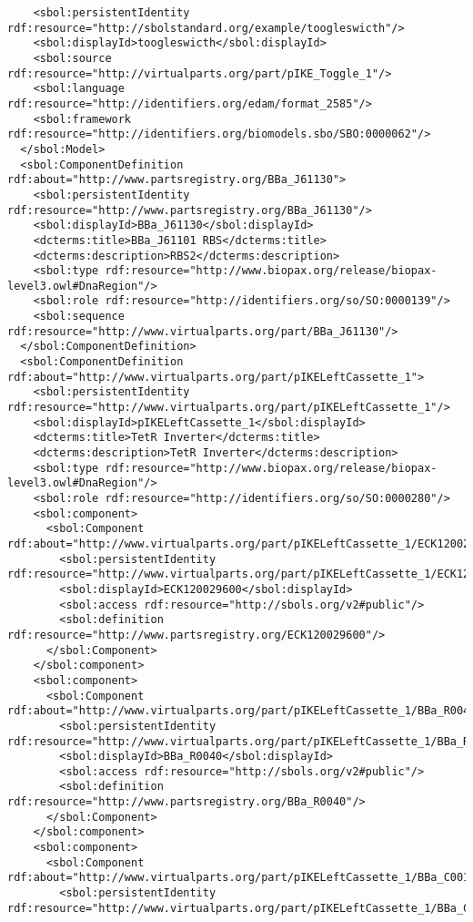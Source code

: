 \begin{lstlisting}
    <sbol:persistentIdentity rdf:resource="http://sbolstandard.org/example/toogleswicth"/>
    <sbol:displayId>toogleswicth</sbol:displayId>
    <sbol:source rdf:resource="http://virtualparts.org/part/pIKE_Toggle_1"/>
    <sbol:language rdf:resource="http://identifiers.org/edam/format_2585"/>
    <sbol:framework rdf:resource="http://identifiers.org/biomodels.sbo/SBO:0000062"/>
  </sbol:Model>
  <sbol:ComponentDefinition rdf:about="http://www.partsregistry.org/BBa_J61130">
    <sbol:persistentIdentity rdf:resource="http://www.partsregistry.org/BBa_J61130"/>
    <sbol:displayId>BBa_J61130</sbol:displayId>
    <dcterms:title>BBa_J61101 RBS</dcterms:title>
    <dcterms:description>RBS2</dcterms:description>
    <sbol:type rdf:resource="http://www.biopax.org/release/biopax-level3.owl#DnaRegion"/>
    <sbol:role rdf:resource="http://identifiers.org/so/SO:0000139"/>
    <sbol:sequence rdf:resource="http://www.virtualparts.org/part/BBa_J61130"/>
  </sbol:ComponentDefinition>
  <sbol:ComponentDefinition rdf:about="http://www.virtualparts.org/part/pIKELeftCassette_1">
    <sbol:persistentIdentity rdf:resource="http://www.virtualparts.org/part/pIKELeftCassette_1"/>
    <sbol:displayId>pIKELeftCassette_1</sbol:displayId>
    <dcterms:title>TetR Inverter</dcterms:title>
    <dcterms:description>TetR Inverter</dcterms:description>
    <sbol:type rdf:resource="http://www.biopax.org/release/biopax-level3.owl#DnaRegion"/>
    <sbol:role rdf:resource="http://identifiers.org/so/SO:0000280"/>
    <sbol:component>
      <sbol:Component rdf:about="http://www.virtualparts.org/part/pIKELeftCassette_1/ECK120029600">
        <sbol:persistentIdentity rdf:resource="http://www.virtualparts.org/part/pIKELeftCassette_1/ECK120029600"/>
        <sbol:displayId>ECK120029600</sbol:displayId>
        <sbol:access rdf:resource="http://sbols.org/v2#public"/>
        <sbol:definition rdf:resource="http://www.partsregistry.org/ECK120029600"/>
      </sbol:Component>
    </sbol:component>
    <sbol:component>
      <sbol:Component rdf:about="http://www.virtualparts.org/part/pIKELeftCassette_1/BBa_R0040">
        <sbol:persistentIdentity rdf:resource="http://www.virtualparts.org/part/pIKELeftCassette_1/BBa_R0040"/>
        <sbol:displayId>BBa_R0040</sbol:displayId>
        <sbol:access rdf:resource="http://sbols.org/v2#public"/>
        <sbol:definition rdf:resource="http://www.partsregistry.org/BBa_R0040"/>
      </sbol:Component>
    </sbol:component>
    <sbol:component>
      <sbol:Component rdf:about="http://www.virtualparts.org/part/pIKELeftCassette_1/BBa_C0012">
        <sbol:persistentIdentity rdf:resource="http://www.virtualparts.org/part/pIKELeftCassette_1/BBa_C0012"/>

\end{lstlisting}
